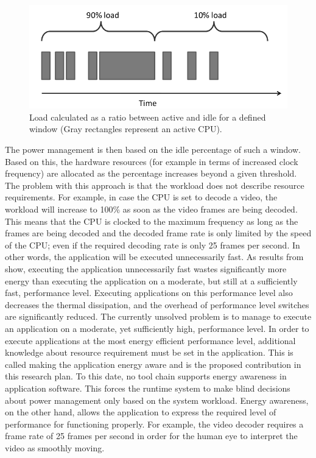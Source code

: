 \documentclass{article}
\begin{document}
\begin{figure}[h]
	\centering
	\includegraphics[scale=0.5]{fig/workload.png}
	\caption{Load calculated as a ratio between active and idle for a defined window (Gray rectangles represent an active CPU).}
	\label{fig:workload}
\end{figure}

The power management is then based on the idle percentage of such a window. 
Based on this, the hardware resources (for example in terms of increased clock frequency) are allocated as the percentage increases beyond a given threshold. 
The problem with this approach is that the workload does not describe resource requirements. 
For example, in case the CPU is set to decode a video, the workload will increase to 100\% as soon as the video frames are being decoded.  
This means that the CPU is clocked to the maximum frequency as long as the frames are being decoded and the decoded frame rate is only limited by the speed of the CPU; 
even if the required decoding rate is only 25 frames per second. In other words, the application will be executed unnecessarily fast. 
As results from \cite{HolmbackaHipeac, HolmbackaDasip} show, executing the application unnecessarily fast wastes significantly more energy than executing the application on a moderate, 
but still at a sufficiently fast, performance level. 
Executing applications on this performance level also decreases the thermal dissipation, and the overhead of performance level switches are significantly reduced.
The currently unsolved problem is to manage to execute an application on a moderate, yet sufficiently high, performance level. 
In order to execute applications at the most energy efficient performance level, additional knowledge about resource requirement must be set in the application. 
This is called making the application energy aware and is the proposed contribution in this research plan. To this date, no tool chain supports energy awareness in application software. 
This forces the runtime system to make blind decisions about power management only based on the system workload. 
Energy awareness, on the other hand, allows the application to express the required level of performance for functioning properly. 
For example, the video decoder requires a frame rate of 25 frames per second in order for the human eye to interpret the video as smoothly moving. 
\end{document}

